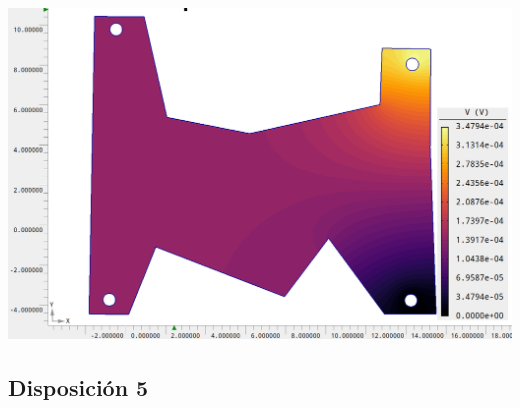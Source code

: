 \documentclass[11pt]{article}
\begin{document}
\begin{minipage}[t]{0.45\linewidth} 
	\begin{center}
	\vspace{0.5em}
	
	\vspace{1.2em}
	\vspace{0.5em}
	
	\end{center}  
\end{minipage}
\hfill
\begin{minipage}[t]{0.45\linewidth}
	\begin{center}
	\label{Fig:06}
	\includegraphics[width=1\linewidth]{Imagen Agros 1/Agros4.png}
	\end{center}  	
\end{minipage}

\subsection{Disposición 5}




\end{document}
